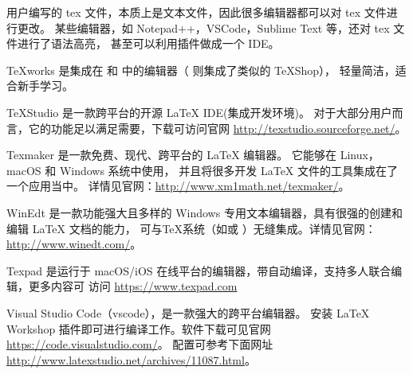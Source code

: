 %
%
%
%
%



用户编写的 tex 文件，本质上是文本文件，因此很多编辑器都可以对 tex 文件进行更改。
某些编辑器，如 Notepad++，VSCode，Sublime Text 等，还对 tex 文件进行了语法高亮，
甚至可以利用插件做成一个 IDE。

TeXworks 是集成在 \TeXLive{} 和 \MiKTeX{} 中的编辑器（\MacTeX{} 则集成了类似的 
TeXShop），
轻量简洁，适合新手学习。

TeXStudio 是一款跨平台的开源 \LaTeX{} IDE(集成开发环境)。
对于大部分用户而言，它的功能足以满足需要，下载可访问官网 
\url{http://texstudio.sourceforge.net/}。

Texmaker 是一款免费、现代、跨平台的 \LaTeX{} 编辑器。 它能够在 Linux，macOS 和 
Windows 系统中使用，
并且将很多开发 \LaTeX{} 文件的工具集成在了一个应用当中。
详情见官网：\url{http://www.xm1math.net/texmaker/}。

WinEdt 是一款功能强大且多样的 Windows 专用文本编辑器，具有很强的创建和编辑 \LaTeX{} 
文档的能力，
可与TeX系统（如\MiKTeX{}或 
\TeXLive{}）无缝集成。详情见官网：\url{http://www.winedt.com/}。

Texpad 是运行于 macOS/iOS 在线平台的编辑器，带自动编译，支持多人联合编辑，更多内容可
访问
\url{https://www.texpad.com}

Visual Studio Code（vscode），是一款强大的跨平台编辑器。
安装 LaTeX Workshop 插件即可进行编译工作。软件下载可见官网 
\url{https://code.visualstudio.com/}。
配置可参考下面网址 \url{http://www.latexstudio.net/archives/11087.html}。


